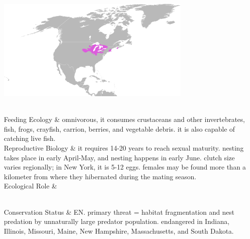 \begin{center}
\begin{longtabu}
	\begin{center} \includegraphics[scale=0.5]{testudines/emydidae/emydoidea/range} \end{center}
	\\
	\hline
	Feeding Ecology & 
	omnivorous, it consumes crustaceans and other invertebrates, fish, frogs, crayfish, carrion, berries, and vegetable debris. it is also capable of catching live fish.
	\\
	\hline
	Reproductive Biology & 
	it requires 14-20 years to reach sexual maturity. nesting takes place in early April-May, and nesting happens in early June. clutch size varies regionally; in New York, it is 5-12 eggs. females may be found more than a kilometer from where they hibernated during the mating season.
	\\
	\hline
	Ecological Role &
	
	\\
	\hline
	Conservation Status & 
	EN. primary threat = habitat fragmentation and nest predation by unnaturally large predator population. endangered in Indiana, Illinois, Missouri, Maine, New Hampshire, Massachusetts, and South Dakota.
	\\
	\hline
\end{longtabu}
\end{center}
